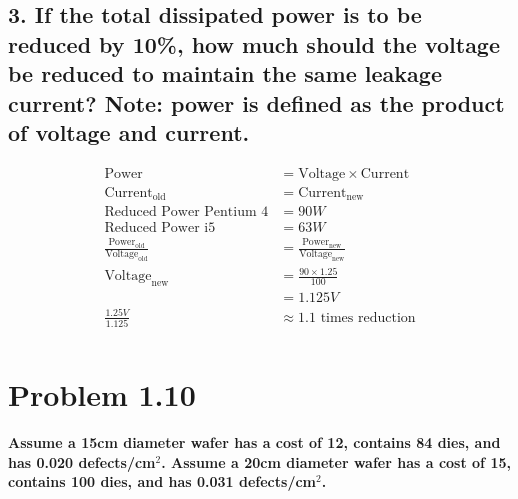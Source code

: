 \documentclass[11pt]{article}
\begin{document}
\subsection*{\small 3. If the total dissipated power is to be reduced by 10\%, how much should the voltage be reduced to maintain the same leakage current? Note: power is defined as the product of voltage and current.}
\begin{align*}
\textrm{Power} & = \textrm{Voltage} \times \textrm{Current}\\
\textrm{Current}_{\textrm{old}} & = \textrm{Current}_{\textrm{new}}\\
\textrm{Reduced Power Pentium 4} & = 90W\\
\textrm{Reduced Power i5} & = 63W\\
\frac{\textrm{Power}_{\textrm{old}}}{\textrm{Voltage}_{\textrm{old}}} & = \frac{\textrm{Power}_{\textrm{new}}}{\textrm{Voltage}_{\textrm{new}}}\\
\textrm{Voltage}_{\textrm{new}} & = \frac{90 \times 1.25}{100}\\
& = 1.125V\\
\frac{1.25V}{1.125} & \approx \boldsymbol{1.1} \textrm{ times reduction}\\
\end{align*}
\section*{Problem 1.10}
\small\textbf{Assume a 15cm diameter wafer has a cost of 12, contains 84 dies, and has 0.020 defects/cm$^2$. Assume a 20cm diameter wafer has a cost of 15, contains 100 dies, and has 0.031 defects/cm$^2$.}
\end{document}
